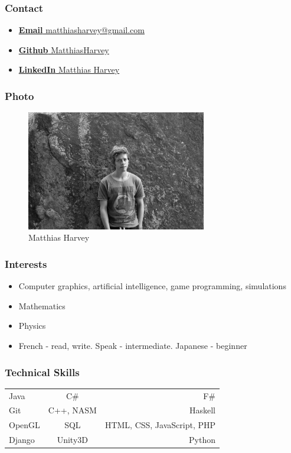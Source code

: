 \documentclass{article}
\begin{document}
	\subsubsection{Contact}
	\begin{itemize}	
		\item \href{mailto:matthiasharvey@gmail.com}
		{\textbf{Email} matthiasharvey@gmail.com}
		\item \href{https://github.com/MatthiasHarvey}
		{\textbf{Github} MatthiasHarvey}
		\item \href{https://za.linkedin.com/in/matthias-harvey-68b30995}
		{\textbf{LinkedIn} Matthias Harvey}
	\end{itemize}
	\subsubsection{Photo}
	\begin{figure}[H]
		\centering
		\includegraphics[width=0.7\textwidth]{../matthias.jpg}
		\caption{Matthias Harvey}
	\end{figure}
	\subsubsection{Interests}
	\begin{itemize}
		\item Computer graphics, artificial intelligence, game programming, simulations
		\item Mathematics
		\item Physics
		\item French - read, write. Speak - intermediate. Japanese - beginner
	\end{itemize}
	\subsubsection{Technical Skills}
	
	\begin{tabular}{| l | c | r |}
		Java   & C\#     & F\#                          \\
		Git    & C++, NASM     & Haskell                     \\
		OpenGL & SQL     & HTML, CSS, JavaScript, PHP   \\
		Django & Unity3D & Python                     
	\end{tabular}
\end{document}
